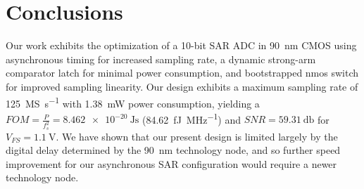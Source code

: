 \documentclass[10pt,journal]{IEEEtran}\usepackage{longtable}
\begin{document}

\section{Conclusions}
Our work exhibits the optimization of a 10-bit SAR ADC in \SI{90}{\nano\metre} CMOS using asynchronous timing for increased sampling rate, a dynamic strong-arm comparator latch for minimal power consumption, and bootstrapped nmos switch for improved sampling linearity. Our design exhibits a maximum sampling rate of \SI{125}{\mega\siemens\per\second} with \SI{1.38}{\milli\watt} power consumption, yielding a $FOM=\frac{P}{f_s^2}=\SI{8.462e-20}{\joule\second}$ (\SI{84.62}{\femto\joule\per\mega\hertz}) and $SNR=\SI{59.31}{\decibel}$ for $V_{FS}=\SI{1.1}{\volt}$. We have shown that our present design is limited largely by the digital delay determined by the \SI{90}{\nano\metre} technology node, and so further speed improvement for our asynchronous SAR configuration would require a newer technology node. 






\end{document}
